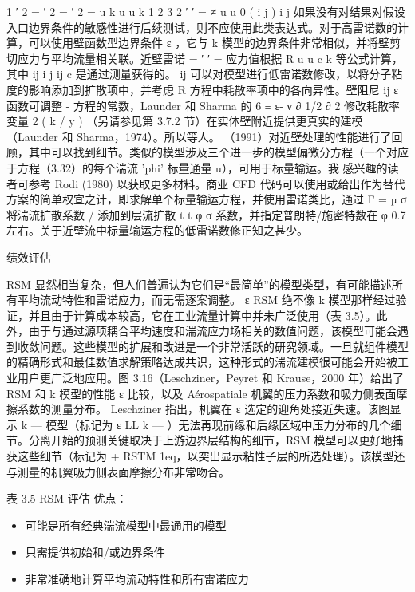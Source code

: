 \documentclass[11pt,a4paper,openany,fontset=none]{ctexbook}
\begin{document}
1 ′ 2 = ′ 2 = ′ 2 = u k u u k 1 2 3 2 ′ ′ = ≠ u u 0 ( i j ) i j 如果没有对结果对假设入口边界条件的敏感性进行后续测试，则不应使用此类表达式。对于高雷诺数的计算，可以使用壁函数型边界条件 ε ，它与 k 模型的边界条件非常相似，并将壁剪切应力与平均流量相关联。近壁雷诺 = ′ ′ = 应力值根据 R u u c k 等公式计算，其中 ij i j ij c 是通过测量获得的。 ij 可以对模型进行低雷诺数修改，以将分子粘度的影响添加到扩散项中，并考虑 R 方程中耗散率项中的各向异性。壁阻尼 ij ε 函数可调整 - 方程的常数，Launder 和 Sharma 的 6 ≡ ε- ν ∂ 1/2 ∂ 2 修改耗散率变量 2 ( k / y ) （另请参见第 3.7.2 节）在实体壁附近提供更真实的建模（Launder 和 Sharma，1974）。所以等人。 （1991）对近壁处理的性能进行了回顾，其中可以找到细节。类似的模型涉及三个进一步的模型偏微分方程（一个对应于方程（3.32）的每个湍流 'phi' 标量通量 u），可用于标量输运。我
感兴趣的读者可参考 Rodi (1980) 以获取更多材料。商业 CFD 代码可以使用或给出作为替代方案的简单权宜之计，即求解单个标量输运方程，并使用雷诺类比，通过 Γ = µ σ 将湍流扩散系数 / 添加到层流扩散 t t φ σ 系数，并指定普朗特/施密特数在 φ 0.7 左右。关于近壁流中标量输运方程的低雷诺数修正知之甚少。

绩效评估

RSM 显然相当复杂，但人们普遍认为它们是“最简单”的模型类型，有可能描述所有平均流动特性和雷诺应力，而无需逐案调整。 ε RSM 绝不像 k 模型那样经过验证，并且由于计算成本较高，它在工业流量计算中并未广泛使用（表 3.5）。此外，由于与通过源项耦合平均速度和湍流应力场相关的数值问题，该模型可能会遇到收敛问题。这些模型的扩展和改进是一个非常活跃的研究领域。一旦就组件模型的精确形式和最佳数值求解策略达成共识，这种形式的湍流建模很可能会开始被工业用户更广泛地应用。图 3.16（Leschziner，Peyret 和 Krause，2000 年）给出了 RSM 和 k 模型的性能 ε 比较，以及 Aérospatiale 机翼的压力系数和吸力侧表面摩擦系数的测量分布。 Leschziner 指出，机翼在 ε 选定的迎角处接近失速。该图显示 k — 模型（标记为 ε LL k — ）无法再现前缘和后缘区域中压力分布的几个细节。分离开始的预测关键取决于上游边界层结构的细节，RSM 模型可以更好地捕获这些细节（标记为 + RSTM 1eq，以突出显示粘性子层的所选处理）。该模型还与测量的机翼吸力侧表面摩擦分布非常吻合。

表 3.5 RSM 评估
优点：

\begin{itemize}

\item 可能是所有经典湍流模型中最通用的模型

\item 只需提供初始和/或边界条件

\item 非常准确地计算平均流动特性和所有雷诺应力

\end{itemize}
\end{document}

